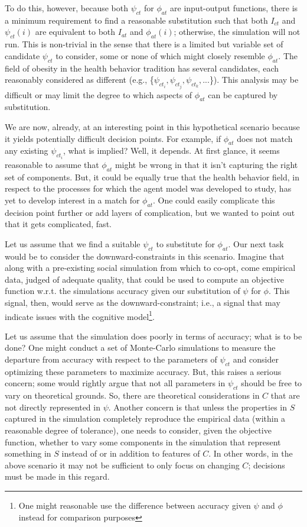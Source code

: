 \documentclass{article}
\begin{document}
To do this, however, because both $\psi_{ct}$ for $\phi_{at}$ are input-output functions, there is a minimum requirement to find a reasonable substitution such that both $I_{ct}$ and $\psi_{ct}(i)$ are equivalent to both $I_{at}$ and $\phi_{at}(i)$; otherwise, the simulation will not run.  This is non-trivial in the sense that there is a limited but variable set of candidate $\psi_{ct}$ to consider, some or none of which might closely resemble $\phi_{at}$.  The field of obesity in the health behavior tradition has several candidates, each reasonably considered as different (e.g., \{$\psi_{ct_i}, \psi_{ct_j}, \psi_{ct_k},...$\}).  This analysis may be difficult or may limit the degree to which aspects of $\phi_{at}$ can be captured by substitution.  

We are now, already, at an interesting point in this hypothetical scenario because it yields potentially difficult decision points.  For example,  if $\phi_{at}$ does not match any existing $\psi_{ct_i}$, what is implied?  Well, it depends.  At first glance, it seems reasonable to assume that $\phi_{at}$ might be wrong in that it isn't capturing the right set of components.  But, it could be equally true that the health behavior field, in respect to the processes for which the agent model was developed to study, has yet to develop interest in a match for $\phi_{at}$.  One could easily complicate this decision point further or add layers of complication, but we wanted to point out that it gets complicated, fast.  

Let us assume that we find a suitable $\psi_{ct}$ to substitute for $\phi_{at}$. Our next task would be to consider the downward-constraints in this scenario.  Imagine that along with a pre-existing social simulation from which to co-opt, come empirical data, judged of adequate quality, that could be used to compute an objective function w.r.t. the simulations accuracy given our substitution of $\psi$ for $\phi$. This signal, then, would serve as the downward-constraint; i.e., a signal that may indicate issues with the cognitive model\footnote{One might reasonable use the difference between accuracy given $\psi$ and $\phi$ instead for comparison purposes}.  

Let us assume that the simulation does poorly in terms of accuracy; what is to be done?  One might conduct a set of Monte-Carlo simulations to measure the departure from accuracy with respect to the parameters of $\psi_{ct}$ and consider optimizing these parameters to maximize accuracy. But, this raises a serious concern; some would rightly argue that not all parameters in $\psi_{ct}$ should be free to vary on theoretical grounds\cite{reitter2010}. So, there are theoretical considerations in $C$ that are not directly represented in $\psi$. Another concern is that unless the properties in $S$ captured in the simulation completely reproduce the empirical data (within a reasonable degree of tolerance), one needs to consider, given the objective function, whether to vary some components in the simulation that represent something in $S$ instead of or in addition to features of $C$.  In other words, in the above scenario it may not be sufficient to only focus on changing $C$; decisions must be made in this regard.   
\end{document}
